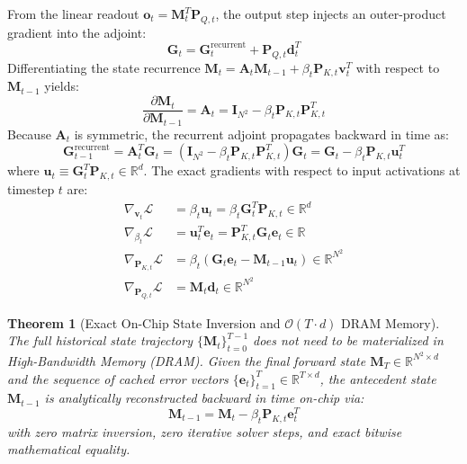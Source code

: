 \documentclass[11pt,a4paper]{article}
\newtheorem{theorem}{Theorem}[section]
\begin{document}
From the linear readout $\mathbf{o}_t = \mathbf{M}_t^T \mathbf{P}_{Q,t}$, the output step injects an outer-product gradient into the adjoint:
\begin{equation}
    \mathbf{G}_t = \mathbf{G}_t^{\text{recurrent}} + \mathbf{P}_{Q,t} \mathbf{d}_t^T
\end{equation}
Differentiating the state recurrence $\mathbf{M}_t = \mathbf{A}_t \mathbf{M}_{t-1} + \beta_t \mathbf{P}_{K,t} \mathbf{v}_t^T$ with respect to $\mathbf{M}_{t-1}$ yields:
\begin{equation}
    \frac{\partial \mathbf{M}_t}{\partial \mathbf{M}_{t-1}} = \mathbf{A}_t = \mathbf{I}_{N^2} - \beta_t \mathbf{P}_{K,t} \mathbf{P}_{K,t}^T
\end{equation}
Because $\mathbf{A}_t$ is symmetric, the recurrent adjoint propagates backward in time as:
\begin{equation}
    \mathbf{G}_{t-1}^{\text{recurrent}} = \mathbf{A}_t^T \mathbf{G}_t = (\mathbf{I}_{N^2} - \beta_t \mathbf{P}_{K,t} \mathbf{P}_{K,t}^T) \mathbf{G}_t = \mathbf{G}_t - \beta_t \mathbf{P}_{K,t} \mathbf{u}_t^T
\end{equation}
where $\mathbf{u}_t \equiv \mathbf{G}_t^T \mathbf{P}_{K,t} \in \mathbb{R}^d$. The exact gradients with respect to input activations at timestep $t$ are:
\begin{align}
    \nabla_{\mathbf{v}_t} \mathcal{L} &= \beta_t \mathbf{u}_t = \beta_t \mathbf{G}_t^T \mathbf{P}_{K,t} \in \mathbb{R}^d \\
    \nabla_{\beta_t} \mathcal{L} &= \mathbf{u}_t^T \mathbf{e}_t = \mathbf{P}_{K,t}^T \mathbf{G}_t \mathbf{e}_t \in \mathbb{R} \\
    \nabla_{\mathbf{P}_{K,t}} \mathcal{L} &= \beta_t \left( \mathbf{G}_t \mathbf{e}_t - \mathbf{M}_{t-1} \mathbf{u}_t \right) \in \mathbb{R}^{N^2} \\
    \nabla_{\mathbf{P}_{Q,t}} \mathcal{L} &= \mathbf{M}_t \mathbf{d}_t \in \mathbb{R}^{N^2}
\end{align}

\begin{theorem}[Exact On-Chip State Inversion and $\mathcal{O}(T \cdot d)$ DRAM Memory]
\label{thm:adjoint_reconstruction}
The full historical state trajectory $\{\mathbf{M}_t\}_{t=0}^{T-1}$ does not need to be materialized in High-Bandwidth Memory (DRAM). Given the final forward state $\mathbf{M}_T \in \mathbb{R}^{N^2 \times d}$ and the sequence of cached error vectors $\{\mathbf{e}_t\}_{t=1}^T \in \mathbb{R}^{T \times d}$, the antecedent state $\mathbf{M}_{t-1}$ is analytically reconstructed backward in time on-chip via:
\begin{equation}
    \mathbf{M}_{t-1} = \mathbf{M}_t - \beta_t \mathbf{P}_{K,t} \mathbf{e}_t^T
\end{equation}
with zero matrix inversion, zero iterative solver steps, and exact bitwise mathematical equality.
\end{theorem}
\end{document}
